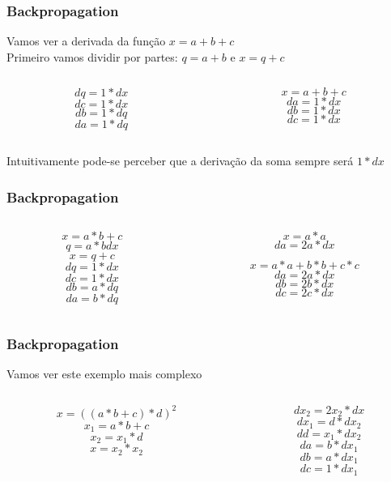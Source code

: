\documentclass{beamer}
\begin{document}
\begin{frame}
	\frametitle{Backpropagation}
	\begin{example}
		Vamos ver a derivada da função $x = a + b + c$ \\
		Primeiro vamos dividir por partes: 
		$q = a+b$ e  $x = q+c$ 
		\begin{columns}
			\begin{column}{0.35\textwidth}
				$$dq = 1 * dx$$
				$$dc = 1 * dx$$
				$$db = 1 * dq$$
				$$da = 1 * dq$$
			\end{column}
			\begin{column}{0.35\textwidth}
				$$x = a + b + c$$ 
				$$da = 1 * dx$$ 
				$$db = 1 * dx$$
				$$dc = 1 * dx$$ 
			\end{column}
		\end{columns}
		Intuitivamente pode-se perceber que a derivação da soma sempre será $1 * dx$
	\end{example}
\end{frame}
\begin{frame}
	\frametitle{Backpropagation}

		\begin{columns}
			\begin{column}{0.35\textwidth}
				\begin{example}
					$$x = a * b + c$$
					$$q = a*b dx$$ 
					$$x = q+c$$ 
					$$dq = 1 * dx$$
					$$dc = 1 * dx$$
					$$db = a * dq$$
					$$da = b * dq$$
				\end{example}
			\end{column}
			\begin{column}{0.35\textwidth}
				\begin{example}
					$$x = a * a$$ 
					$$da = 2a * dx$$
				\end{example} 
				\begin{example}
				$$x = a * a + b * b + c * c$$ 
				$$da = 2a * dx$$
				$$db = 2b * dx$$
				$$dc = 2c * dx$$
			\end{example} 
			\end{column}
		\end{columns}

\end{frame}
\begin{frame}
	\frametitle{Backpropagation}
	\begin{example}
		Vamos ver este exemplo mais complexo
		\begin{columns}
			\begin{column}{0.35\textwidth}
				$$x = ((a * b + c) * d)^2$$
				$$x_1 = a*b+c$$ 
				$$x_2 = x_1*d$$ 
				$$x = x_2 * x_2 $$
			\end{column}
			\begin{column}{0.35\textwidth}
				$$dx_2 = 2x_2 * dx$$ 
				$$dx_1 = d * dx_2$$ 
				$$dd = x_1*dx_2$$
				$$da = b*dx_1$$
				$$db = a*dx_1$$
				$$dc = 1*dx_1$$
			\end{column}
		\end{columns}
	\end{example}
\end{frame}
\end{document}

